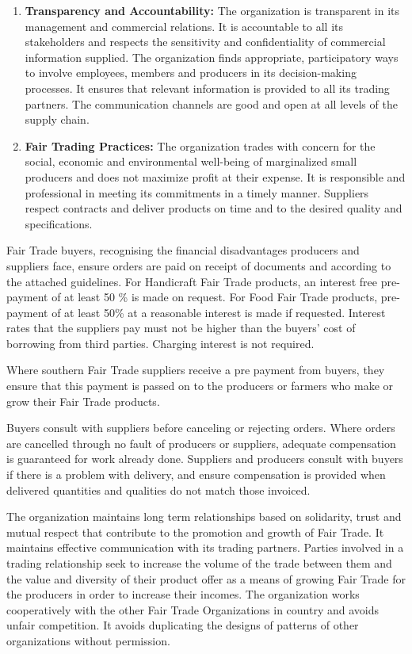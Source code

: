 \documentclass[]{book}
\begin{document}
\begin{enumerate}
\def\labelenumi{\arabic{enumi}.}
\setcounter{enumi}{1}
\item
  \textbf{Transparency and Accountability:}
  The organization is transparent in its management and commercial relations. It is accountable to all its stakeholders and respects the sensitivity and confidentiality of commercial information supplied. The organization finds appropriate, participatory ways to involve employees, members and producers in its decision-making processes. It ensures that relevant information is provided to all its trading partners. The communication channels are good and open at all levels of the supply chain.
\item
  \textbf{Fair Trading Practices:}
  The organization trades with concern for the social, economic and environmental well-being of marginalized small producers and does not maximize profit at their expense. It is responsible and professional in meeting its commitments in a timely manner. Suppliers respect contracts and deliver products on time and to the desired quality and specifications.
\end{enumerate}

Fair Trade buyers, recognising the financial disadvantages producers and suppliers face, ensure orders are paid on receipt of documents and according to the attached guidelines. For Handicraft Fair Trade products, an interest free pre-payment of at least 50 \% is made on request. For Food Fair Trade products, pre-payment of at least 50\% at a reasonable interest is made if requested. Interest rates that the suppliers pay must not be higher than the buyers' cost of borrowing from third parties. Charging interest is not required.

Where southern Fair Trade suppliers receive a pre payment from buyers, they ensure that this payment is passed on to the producers or farmers who make or grow their Fair Trade products.

Buyers consult with suppliers before canceling or rejecting orders. Where orders are cancelled through no fault of producers or suppliers, adequate compensation is guaranteed for work already done. Suppliers and producers consult with buyers if there is a problem with delivery, and ensure compensation is provided when delivered quantities and qualities do not match those invoiced.

The organization maintains long term relationships based on solidarity, trust and mutual respect that contribute to the promotion and growth of Fair Trade. It maintains effective communication with its trading partners. Parties involved in a trading relationship seek to increase the volume of the trade between them and the value and diversity of their product offer as a means of growing Fair Trade for the producers in order to increase their incomes. The organization works cooperatively with the other Fair Trade Organizations in country and avoids unfair competition. It avoids duplicating the designs of patterns of other organizations without permission.
\end{document}
